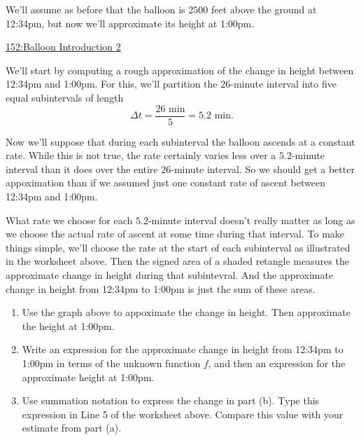 \documentclass{ximera}
\begin{document}
\begin{example} \label{ExLKDrDEfRE9}

We'll assume as before that the balloon is $2500$ feet above the ground at 12:34pm, but now we'll approximate its height at 1:00pm.

\begin{onlineOnly}
    \begin{center}
\end{center}
\end{onlineOnly}

\href{https://www.desmos.com/calculator/h6cworakdw}{152:Balloon Introduction 2}

We'll start by computing a rough approximation of the change in height between 12:34pm and 1:00pm. For this, we'll partition the $26$-minute interval into five equal subintervals of length 
\[
  \Delta t = \frac{26\text{ min}}{5} = 5.2 \text{ min}.
\]
 
Now we'll suppose that during each subinterval the balloon ascends at a constant rate. While this is not true, the rate certainly varies less over a $5.2$-minute interval than it does over the entire $26$-minute interval. So we should get a better appoximation  than if we assumed just one constant rate of ascent between 12:34pm and 1:00pm.

What rate we choose for each $5.2$-minute interval doesn't really matter as long as we choose the actual rate of ascent at some time during that interval. To make things simple, we'll choose the rate at the start of each subinterval as illustrated in the worksheet above. Then the signed area of a shaded retangle measures the approximate change in height during that subintevral. And the approximate change in height from 12:34pm to 1:00pm is just the sum of these areas.

\begin{enumerate}
\item Use the graph above to appoximate the change in height. Then approximate the height at 1:00pm.

\item Write an expression for the approximate change in height from 12:34pm to 1:00pm in terms of the unknown function $f$, and then an expression for the approximate height at 1:00pm.

\item Use summation notation to express the change in part (b). Type this expression in Line 5 of the worksheet above. Compare this value with your estimate from part (a).


\end{enumerate}
\end{example}
\end{document}

